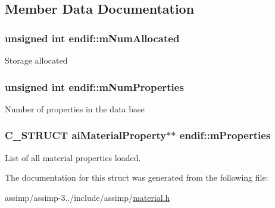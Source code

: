 \subsection{Member Data Documentation}
\hypertarget{structendif_add50ca52ed05564f2187b9893fb1f584}{
\subsubsection[{m\+Num\+Allocated}]{\setlength{\rightskip}{0pt plus 5cm}unsigned int endif\+::m\+Num\+Allocated}}\label{structendif_add50ca52ed05564f2187b9893fb1f584}
Storage allocated \hypertarget{structendif_a751ff065f0b034cfd9cd08d7bc41d668}{
\subsubsection[{m\+Num\+Properties}]{\setlength{\rightskip}{0pt plus 5cm}unsigned int endif\+::m\+Num\+Properties}}\label{structendif_a751ff065f0b034cfd9cd08d7bc41d668}
Number of properties in the data base \hypertarget{structendif_a95295db8cbd37f02553457d84d65068a}{
\subsubsection[{m\+Properties}]{\setlength{\rightskip}{0pt plus 5cm}C\+\_\+\+S\+T\+R\+U\+C\+T {\bf ai\+Material\+Property}$\ast$$\ast$ endif\+::m\+Properties}}\label{structendif_a95295db8cbd37f02553457d84d65068a}
List of all material properties loaded. 

The documentation for this struct was generated from the following file\+:\begin{DoxyCompactItemize}
\item 
assimp/assimp-\/3../include/assimp/\hyperlink{material_8h}{material.\+h}\end{DoxyCompactItemize}
